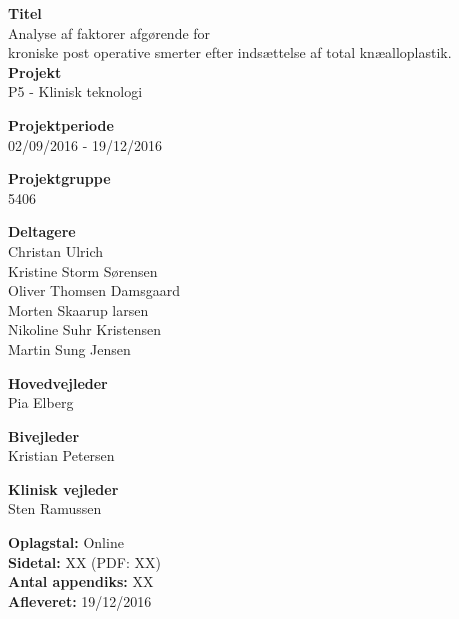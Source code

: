 \begin{minipage}[t]{0.48\textwidth}
\textbf{Titel} \\[5pt]\hspace*{2ex} 
Analyse af faktorer afgørende for \\\hspace*{2ex}
kroniske post operative smerter efter indsættelse af total knæalloplastik.\\


\textbf{Projekt} \\[5pt]\hspace*{2ex} 
P5 - Klinisk teknologi\\\hspace*{2ex}


\textbf{Projektperiode} \\[5pt]\bigskip\hspace{2ex}
02/09/2016 - 19/12/2016

\textbf{Projektgruppe} \\[5pt]\bigskip\hspace{2ex}
5406

\textbf{Deltagere} \\[5pt]\hspace*{2ex}
Christan Ulrich \\\hspace*{2ex}
Kristine Storm Sørensen \\\hspace*{2ex}
Oliver Thomsen Damsgaard \\\hspace*{2ex}
Morten Skaarup larsen\\\hspace*{2ex}
Nikoline Suhr Kristensen \\\hspace*{2ex}
Martin Sung Jensen \\\bigskip\hspace{2ex}


\textbf{Hovedvejleder} \\[5pt]\hspace*{2ex}
Pia  Elberg \\\bigskip\hspace{2ex}

\textbf{Bivejleder} \\[5pt]\hspace*{2ex}
Kristian Petersen\\\bigskip\hspace{2ex}

\textbf{Klinisk vejleder} \\[5pt]\hspace*{2ex}
Sten Ramussen\\\bigskip\hspace{2ex}


\vspace*{1cm}

\textbf{Oplagstal:} Online \\
\textbf{Sidetal:} XX (PDF: XX) \\
\textbf{Antal appendiks:} XX \\ 
\textbf{Afleveret:} 19/12/2016

\end{minipage}
